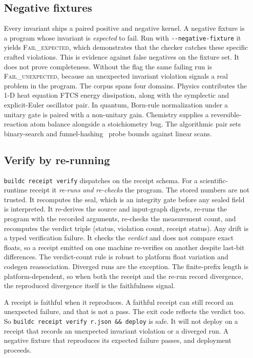 \documentclass[11pt]{article}
\begin{document}
\subsection{Negative fixtures}

Every invariant ships a paired positive and negative kernel. A negative fixture is a program whose invariant is \emph{expected} to fail. Run with \texttt{-{}-negative-fixture} it yields \textsc{Fail\_expected}, which demonstrates that the checker catches these specific crafted violations. This is evidence against false negatives on the fixture set. It does not prove completeness. Without the flag the same failing run is \textsc{Fail\_unexpected}, because an unexpected invariant violation signals a real problem in the program. The corpus spans four domains. Physics contributes the 1-D heat equation FTCS energy dissipation, along with the symplectic and explicit-Euler oscillator pair. In quantum, Born-rule normalization under a unitary gate is paired with a non-unitary gain. Chemistry supplies a reversible-reaction atom balance alongside a stoichiometry bug. The algorithmic pair sets binary-search and funnel-hashing~\cite{funnel} probe bounds against linear scans.

\subsection{Verify by re-running}

\texttt{buildc receipt verify} dispatches on the receipt schema. For a scientific-runtime receipt it \emph{re-runs and re-checks} the program. The stored numbers are not trusted. It recomputes the seal, which is an integrity gate before any sealed field is interpreted. It re-derives the source and input-graph digests, re-runs the program with the recorded arguments, re-checks the measurement count, and recomputes the verdict triple (status, violation count, receipt status). Any drift is a typed verification failure. It checks the \emph{verdict} and does not compare exact floats, so a receipt emitted on one machine re-verifies on another despite last-bit differences. The verdict-count rule is robust to platform float variation and codegen reassociation. Diverged runs are the exception. The finite-prefix length is platform-dependent, so when both the receipt and the re-run record divergence, the reproduced divergence itself is the faithfulness signal.

A receipt is faithful when it reproduces. A faithful receipt can still record an unexpected failure, and that is not a pass. The exit code reflects the verdict too. So \texttt{buildc receipt verify r.json \&\& deploy} is safe. It will not deploy on a receipt that records an unexpected invariant violation or a diverged run. A negative fixture that reproduces its expected failure passes, and deployment proceeds.
\end{document}
